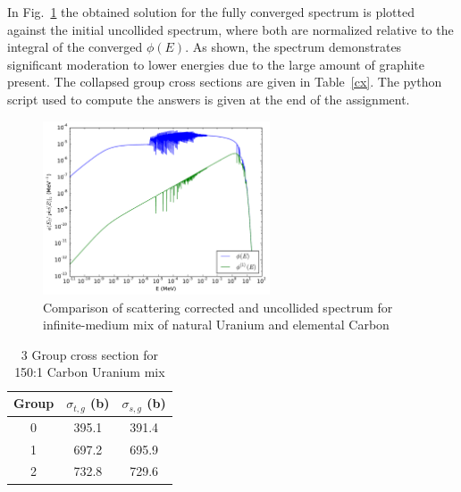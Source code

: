 \documentclass[12pt]{article}
\newenvironment{solnum}[2][Solution]{\begin{trivlist}
\item[\hskip \labelsep {\bfseries #1}\hskip \labelsep {\bfseries #2:}]\hspace{0.3in}\newline\newline}{\end{trivlist}}
\begin{document}
\begin{solnum}{1}
In Fig.~\ref{1} the obtained solution for the fully converged spectrum is plotted against the initial
uncollided spectrum, where
both are normalized relative to the integral of the converged $\phi(E)$. As shown,
the spectrum demonstrates significant moderation to lower energies due to the large amount of graphite
present. The collapsed group cross sections are given in Table~\ref{cx}.
The python script used to compute the answers is given at the end of the assignment.
\begin{figure}[htb]
\centering
\includegraphics[width=0.6\textwidth]{uc_spect.pdf}
\caption{\label{1}Comparison of scattering corrected and uncollided spectrum for
infinite-medium mix of natural Uranium and elemental Carbon}
\end{figure}
\begin{table}
    \centering
    \caption{3 Group cross section for 150:1 Carbon Uranium mix}
    \begin{tabular}{|ccc|}\hline
        Group & $\sigma_{t,g}$ (b) & $\sigma_{s,g}$ (b) \\ \hline
         0    &  395.1   & 391.4 \\ 
         1    &  697.2   & 695.9 \\
         2    &  732.8   & 729.6 \\ \hline
     \end{tabular}
\end{table}






\end{solnum}

\clearpage
\end{document}
